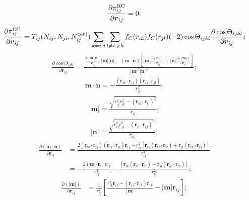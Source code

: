 \documentclass[12pt,a4paper]{report}
\newcommand{\vect}[1]{\boldsymbol{#1}}
\begin{document}
\begin{align} 
\frac{\partial  \pi_{ij}^{\rm RC}}{\partial \vect{r}_{ij}} =0.
\end{align}
\begin{align} 
\frac{\partial  \pi_{ij}^{\rm DH}}{\partial \vect{r}_{ij}} = T_{ij}(N_{ij},N_{ji},N_{ij}^{\rm conj}) 
\sum_{k\neq i,j}\sum_{l\neq i,j,k} f_{C}(r_{ik}) f_{C}(r_{jl}) (-2)\cos\Theta_{ijkl} 
\frac{\partial \cos\Theta_{ijkl}}{\partial \vect{r}_{ij}};
\end{align}
\begin{align} 
\frac{\partial \cos\Theta_{ijkl}}{\partial \vect{r}_{ij}} 
= \frac{\frac{\partial (\vect{m}\cdot\vect{n})}{\partial \vect{r}_{ij}} |\vect{m}|| \vect{n}|
-  (\vect{m}\cdot\vect{n}) 
\left[ |\vect{m}| \frac{\partial (| \vect{n}|) } { \partial \vect{r}_{ij}} + |\vect{n}| \frac{\partial (| \vect{m}|) } { \partial \vect{r}_{ij}}  \right] }
{|\vect{m}|^2 |\vect{n}|^2};
\end{align}
\begin{align} 
\vect{m}\cdot\vect{n} = -  \frac{(\vect{r}_{ik} \cdot \vect{r}_{ij}) (\vect{r}_{ij} \cdot \vect{r}_{jl}) }{r_{ij}^2};
\end{align}
\begin{align} 
|\vect{m}|
 = \frac{\sqrt{ r_{ij}^2r_{ik}^2-(\vect{r}_{ik} \cdot \vect{r}_{ij})^2} } {r_{ij}};
\end{align}
\begin{align} 
| \vect{n}|
 = \frac{  \sqrt{ r_{ij}^2r_{jl}^2-(\vect{r}_{jl} \cdot \vect{r}_{ij})^2} } {r_{ij}};
\end{align}
\begin{align} 
\frac{\partial (\vect{m}\cdot\vect{n})}{\partial \vect{r}_{ij}} 
& =  \frac{ 2 (\vect{r}_{ik} \cdot \vect{r}_{ij}) (\vect{r}_{ij} \cdot \vect{r}_{jl})  \vect{r}_{ij} 
- r_{ij}^2 \left[\vect{r}_{ik}  (\vect{r}_{ij} \cdot \vect{r}_{jl} )  + \vect{r}_{jl}  (\vect{r}_{ik} \cdot \vect{r}_{ij} ) \right] } 
{r_{ij}^4} \nonumber \\
& = - \frac{ 2  (\vect{m}\cdot\vect{n}) \vect{r}_{ij} } {r_{ij}^2}
- \frac{ \left[\vect{r}_{ik}  (\vect{r}_{ij} \cdot \vect{r}_{jl} )  + \vect{r}_{jl}  (\vect{r}_{ik} \cdot \vect{r}_{ij} ) \right] } {{r_{ij}^2}};
\end{align}
\begin{align} 
\frac{\partial (|\vect{m}|) }{ \partial \vect{r}_{ij}} 
& = 
\frac{1}{r_{ij}^2}
\left[
    \frac{r_{ik}^2 \vect{r}_{ij} - (\vect{r}_{ij} \cdot \vect{r}_{ik}) \vect{r}_{ik} }{|\vect{m}|} - |\vect{m}| \vect{r}_{ij}
\right] ;
\end{align}
\end{document}
